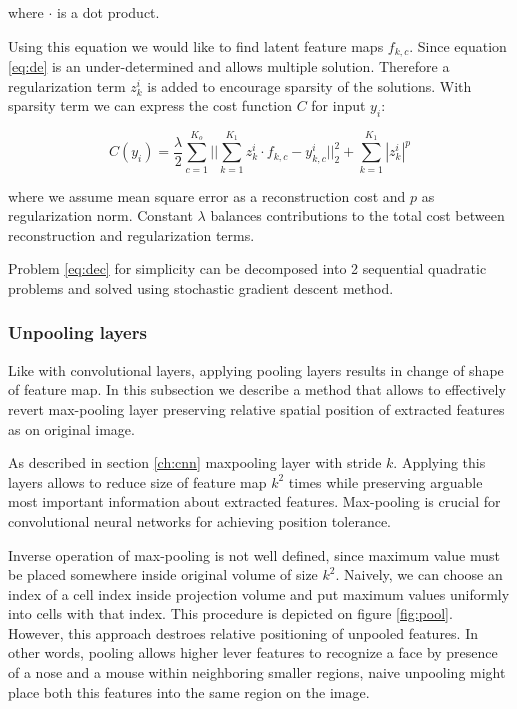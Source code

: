 where $\cdot$ is a dot product.

Using this equation we would like to find latent feature maps $f_{k,c}$.
Since equation \ref{eq:de} is an under-determined and allows multiple solution.
Therefore a regularization term $z^i_k$ is added to encourage sparsity of the solutions.
With sparsity term we can express the cost function $C$ for input $y_i$:

\begin{equation}\label{eq:dec}
    C(y_i) = \frac{\lambda}{2} \sum^{K_o}_{c=1} ||\sum^{K_1}_{k=1}{z^i_k \cdot f_{k,c} - y^i_{k,c}}||^2_2 + \sum^{K_1}_{k=1}{|z^i_k|^p}
\end{equation}

where we assume mean square error as a reconstruction cost and $p$ as regularization norm.
Constant $\lambda$ balances contributions to the total cost between reconstruction and regularization terms.

Problem \ref{eq:dec} for simplicity can be decomposed into 2 sequential quadratic problems and solved using stochastic gradient descent method.

\subsubsection{Unpooling layers}

Like with convolutional layers, applying pooling layers results in change of shape of feature map.
In this subsection we describe a method that allows to effectively revert max-pooling layer preserving relative spatial position of extracted features as on original image.

As described in section \ref{ch:cnn} maxpooling layer with stride $k$.
Applying this layers allows to reduce size of feature map $k^2$ times while preserving arguable most important information about extracted features.
Max-pooling is crucial for convolutional neural networks for achieving position tolerance.

Inverse operation of max-pooling is not well defined, since maximum value must be placed somewhere inside original volume of size $k^2$. Naively, we can choose an index of a cell index inside projection volume and put maximum values uniformly into cells with that index.
This procedure is depicted on figure \ref{fig:pool}.
However, this approach destroes relative positioning of unpooled features.
In other words, pooling allows higher lever features to recognize a face by presence of a nose and a mouse within neighboring smaller regions, naive unpooling might place both this features into the same region on the image.

